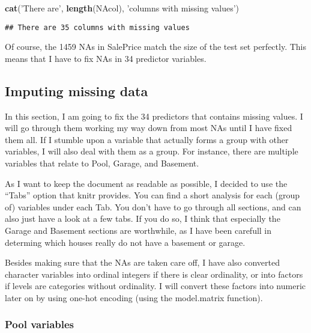 \documentclass[]{article}
\newenvironment{Shaded}{\begin{snugshade}}{\end{snugshade}}
\newcommand{\KeywordTok}[1]{\textcolor[rgb]{0.13,0.29,0.53}{\textbf{#1}}}
\newcommand{\StringTok}[1]{\textcolor[rgb]{0.31,0.60,0.02}{#1}}
\newcommand{\NormalTok}[1]{#1}
\begin{document}
\begin{Shaded}
\begin{Highlighting}[]
\KeywordTok{cat}\NormalTok{(}\StringTok{'There are'}\NormalTok{, }\KeywordTok{length}\NormalTok{(NAcol), }\StringTok{'columns with missing values'}\NormalTok{)}
\end{Highlighting}
\end{Shaded}

\begin{verbatim}
## There are 35 columns with missing values
\end{verbatim}

Of course, the 1459 NAs in SalePrice match the size of the test set
perfectly. This means that I have to fix NAs in 34 predictor variables.

\subsection{Imputing missing data}\label{imputing-missing-data}

In this section, I am going to fix the 34 predictors that contains
missing values. I will go through them working my way down from most NAs
until I have fixed them all. If I stumble upon a variable that actually
forms a group with other variables, I will also deal with them as a
group. For instance, there are multiple variables that relate to Pool,
Garage, and Basement.

As I want to keep the document as readable as possible, I decided to use
the ``Tabs'' option that knitr provides. You can find a short analysis
for each (group of) variables under each Tab. You don't have to go
through all sections, and can also just have a look at a few tabs. If
you do so, I think that especially the Garage and Basement sections are
worthwhile, as I have been carefull in determing which houses really do
not have a basement or garage.

Besides making sure that the NAs are taken care off, I have also
converted character variables into ordinal integers if there is clear
ordinality, or into factors if levels are categories without ordinality.
I will convert these factors into numeric later on by using one-hot
encoding (using the model.matrix function).

\subsubsection{Pool variables}\label{pool-variables}
\end{document}
